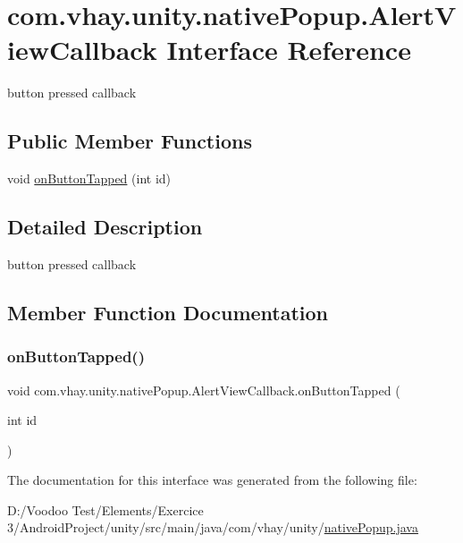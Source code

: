 \hypertarget{interfacecom_1_1vhay_1_1unity_1_1native_popup_1_1_alert_view_callback}{}\section{com.\+vhay.\+unity.\+native\+Popup.\+Alert\+View\+Callback Interface Reference}
\label{interfacecom_1_1vhay_1_1unity_1_1native_popup_1_1_alert_view_callback}


button pressed callback  


\subsection*{Public Member Functions}
\begin{DoxyCompactItemize}
\item 
void \mbox{\hyperlink{interfacecom_1_1vhay_1_1unity_1_1native_popup_1_1_alert_view_callback_a536a27d9bb237d6517524dd498306ac0}{on\+Button\+Tapped}} (int id)
\end{DoxyCompactItemize}


\subsection{Detailed Description}
button pressed callback 

\subsection{Member Function Documentation}
\mbox{\label{interfacecom_1_1vhay_1_1unity_1_1native_popup_1_1_alert_view_callback_a536a27d9bb237d6517524dd498306ac0}} 
\subsubsection{\texorpdfstring{on\+Button\+Tapped()}{onButtonTapped()}}
{\footnotesize\ttfamily void com.\+vhay.\+unity.\+native\+Popup.\+Alert\+View\+Callback.\+on\+Button\+Tapped (\begin{DoxyParamCaption}\item[{int}]{id }\end{DoxyParamCaption})}



The documentation for this interface was generated from the following file\+:\begin{DoxyCompactItemize}
\item 
D\+:/\+Voodoo Test/\+Elements/\+Exercice 3/\+Android\+Project/unity/src/main/java/com/vhay/unity/\mbox{\hyperlink{native_popup_8java}{native\+Popup.\+java}}\end{DoxyCompactItemize}
